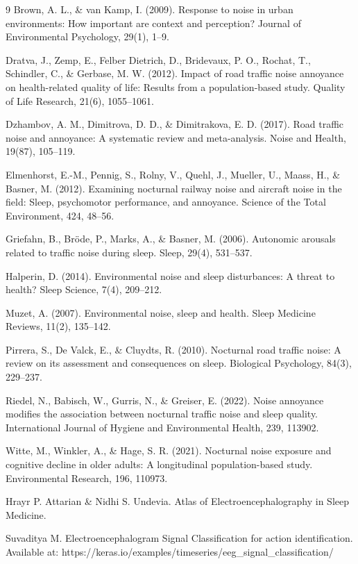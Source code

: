 \begin{thebibliography}{9}
Brown, A. L., \& van Kamp, I. (2009). Response to noise in urban environments: How important are context and perception? Journal of Environmental Psychology, 29(1), 1–9.

Dratva, J., Zemp, E., Felber Dietrich, D., Bridevaux, P. O., Rochat, T., Schindler, C., \& Gerbase, M. W. (2012). Impact of road traffic noise annoyance on health-related quality of life: Results from a population-based study. Quality of Life Research, 21(6), 1055–1061.

Dzhambov, A. M., Dimitrova, D. D., \& Dimitrakova, E. D. (2017). Road traffic noise and annoyance: A systematic review and meta-analysis. Noise and Health, 19(87), 105–119.

Elmenhorst, E.-M., Pennig, S., Rolny, V., Quehl, J., Mueller, U., Maass, H., \& Basner, M. (2012). Examining nocturnal railway noise and aircraft noise in the field: Sleep, psychomotor performance, and annoyance. Science of the Total Environment, 424, 48–56.

Griefahn, B., Bröde, P., Marks, A., \& Basner, M. (2006). Autonomic arousals related to traffic noise during sleep. Sleep, 29(4), 531–537.

Halperin, D. (2014). Environmental noise and sleep disturbances: A threat to health? Sleep Science, 7(4), 209–212.

Muzet, A. (2007). Environmental noise, sleep and health. Sleep Medicine Reviews, 11(2), 135–142.

Pirrera, S., De Valck, E., \& Cluydts, R. (2010). Nocturnal road traffic noise: A review on its assessment and consequences on sleep. Biological Psychology, 84(3), 229–237.

Riedel, N., Babisch, W., Gurris, N., \& Greiser, E. (2022). Noise annoyance modifies the association between nocturnal traffic noise and sleep quality. International Journal of Hygiene and Environmental Health, 239, 113902.

Witte, M., Winkler, A., \& Hage, S. R. (2021). Nocturnal noise exposure and cognitive decline in older adults: A longitudinal population-based study. Environmental Research, 196, 110973.

Hrayr P. Attarian \& Nidhi S. Undevia. Atlas of Electroencephalography in Sleep Medicine. 

Suvaditya M. Electroencephalogram Signal Classification for action identification. Available at: https://keras.io/examples/timeseries/eeg\_signal\_classification/


\end{thebibliography}
